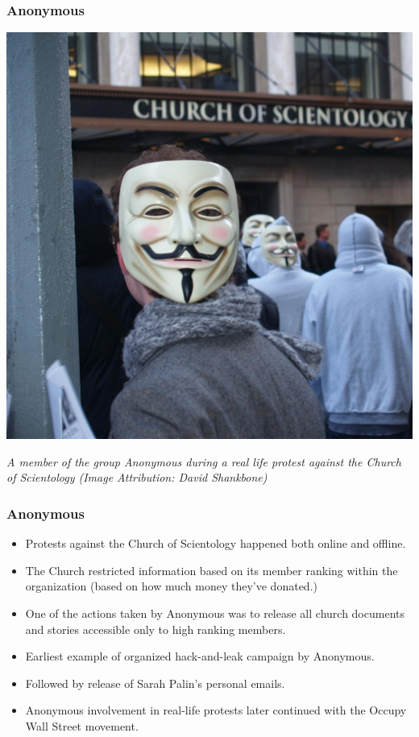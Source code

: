 \documentclass[aspectratio=169,usenames,dvipsnames]{beamer}
\begin{document}
\begin{frame}[c]
  \frametitle{Anonymous}

  \centering

  \includegraphics[width=\textwidth,height=0.7\textheight,keepaspectratio]{img/anonymous.jpg}

  \footnotesize
  \emph{A member of the group Anonymous during a real life protest against the
  Church of Scientology (Image Attribution: David Shankbone)}

\end{frame}

\begin{frame}
  \frametitle{Anonymous}

  \begin{itemize}[<+->]
    \item Protests against the Church of Scientology happened both online and
      offline.
    \item The Church restricted information based on its member ranking
      within the organization (based on how much money they've
      donated.)
    \item One of the actions taken by Anonymous was to release all church
      documents and stories accessible only to high ranking members.
    \item Earliest example of organized hack-and-leak campaign by Anonymous.
    \item Followed by release of Sarah Palin's personal emails.
    \item Anonymous involvement in real-life protests later continued with the
      Occupy Wall Street movement.
  \end{itemize}

\end{frame}
\end{document}
